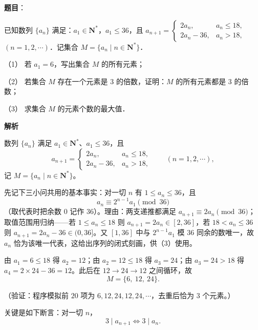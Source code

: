 \begin{answer}

\textbf{题目}：

已知数列 \(\{a_{n}\}\) 满足：\(a_{1}\in\mathbf{N}^{*}\)，\(a_{1}\leqslant 36\)，且 $a_{n+1}=\begin{cases}2a_{n}, & a_{n}\leqslant 18,\\ 2a_{n}-36, & a_{n}>18,\end{cases}$ \((n=1,2,\cdots)\)．记集合 \(M=\{a_{n}\mid n\in\mathbf{N}^{*}\}\)．

（1） 若 \(a_{1}=6\)，写出集合 \(M\) 的所有元素；

（2） 若集合 \(M\) 存在一个元素是 \(3\) 的倍数，证明：\(M\) 的所有元素都是 \(3\) 的倍数；

（3） 求集合 \(M\) 的元素个数的最大值．

\textbf{解析}

数列 \(\{a_{n}\}\) 满足 \(a_{1}\in\mathbf{N}^{*}\)、\(a_{1}\leqslant36\)，且
\nopagebreak[4]
\[
a_{n+1}=\begin{cases}2a_{n}, & a_{n}\leqslant18,\\ 2a_{n}-36, & a_{n}>18,\end{cases}\qquad(n=1,2,\cdots),
\]
记 \(M=\{a_{n}\mid n\in\mathbf{N}^{*}\}\)。

先记下三小问共用的基本事实：对一切 \(n\) 有 \(1\leqslant a_{n}\leqslant36\)，且
\nopagebreak[4]
\[
a_{n}\equiv2^{n-1}a_{1}\pmod{36}
\]
（取代表时把余数 \(0\) 记作 \(36\)）。理由：两支递推都满足 \(a_{n+1}\equiv2a_{n}\pmod{36}\)；取值范围用归纳——若 \(1\leqslant a_{n}\leqslant18\) 则 \(a_{n+1}=2a_{n}\in[2,36]\)，若 \(18<a_{n}\leqslant36\) 则 \(a_{n+1}=2a_{n}-36\in(0,36]\)。又 \([1,36]\) 中与 \(2^{n-1}a_{1}\) 模 \(36\) 同余的数唯一，故 \(a_{n}\) 恰为该唯一代表，这给出序列的闭式刻画，供（3）使用。


由 \(a_{1}=6\leqslant18\) 得 \(a_{2}=12\)；由 \(a_{2}=12\leqslant18\) 得 \(a_{3}=24\)；由 \(a_{3}=24>18\) 得 \(a_{4}=2\times24-36=12\)。此后在 \(12\to24\to12\) 之间循环，故
\nopagebreak[4]
\[
M=\{6,\ 12,\ 24\}.
\]

（验证：程序模拟前 \(20\) 项为 \(6,12,24,12,24,\cdots\)，去重后恰为 \(3\) 个元素。）


关键是如下断言：对一切 \(n\)，
\nopagebreak[4]
\[
3\mid a_{n+1}\iff3\mid a_{n}.
\]


\end{answer}
